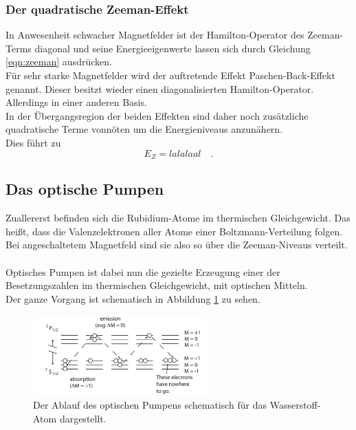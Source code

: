 \subsubsection{Der quadratische Zeeman-Effekt}

\noindent
In Anwesenheit schwacher Magnetfelder ist der Hamilton-Operator des Zeeman-Terms diagonal und seine Energieeigenwerte lassen sich durch Gleichung \ref{eqn:zeeman} ausdrücken.\\
Für sehr starke Magnetfelder wird der auftretende Effekt Paschen-Back-Effekt genannt. Dieser besitzt wieder einen diagonalisierten Hamilton-Operator. Allerdings in einer anderen Basis.\\
In der Übergangsregion der beiden Effekten sind daher noch zusätzliche quadratische Terme vonnöten um die Energieniveaus anzunähern.\\
Dies führt zu 
\begin{equation*}
 E_{Z} = lalalaal  \quad . 
\end{equation*} 


\subsection{Das optische Pumpen}

\noindent
Zuallererst befinden sich die Rubidium-Atome im thermischen Gleichgewicht. 
Das heißt, dass die Valenzelektronen aller Atome einer Boltzmann-Verteilung folgen. 
Bei angeschaltetem Magnetfeld sind sie also so über die Zeeman-Niveaus verteilt.\\\\
Optisches Pumpen ist dabei nun die gezielte Erzeugung einer der Besetzungszahlen im thermischen Gleichgewicht, mit optischen Mitteln.\\
Der ganze Vorgang ist schematisch in Abbildung \ref{img:pumpitup} zu sehen.

\begin{figure}[H]
    \centering
    \includegraphics[width=0.6\textwidth]{latex/images/pumping.PNG}
    \caption{Der Ablauf des optischen Pumpens schematisch für das Wasserstoff-Atom dargestellt\protect \cite{pump_1}.}
    \label{img:pumpitup}
\end{figure}

